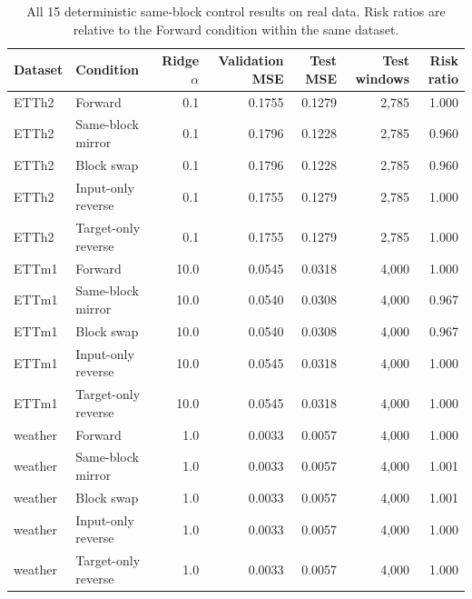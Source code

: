 
\begin{table}[t]
\centering
\caption{All 15 deterministic same-block control results on real data. Risk ratios are relative to the Forward condition within the same dataset.}
\label{tab:same-block-all}
\small
\begin{tabular}{@{}llrrrrr@{}}
\toprule
Dataset & Condition & Ridge $\alpha$ & Validation MSE & Test MSE & Test windows & Risk ratio\\
\midrule
ETTh2 & Forward & 0.1 & 0.1755 & 0.1279 & 2,785 & 1.000 \\
ETTh2 & Same-block mirror & 0.1 & 0.1796 & 0.1228 & 2,785 & 0.960 \\
ETTh2 & Block swap & 0.1 & 0.1796 & 0.1228 & 2,785 & 0.960 \\
ETTh2 & Input-only reverse & 0.1 & 0.1755 & 0.1279 & 2,785 & 1.000 \\
ETTh2 & Target-only reverse & 0.1 & 0.1755 & 0.1279 & 2,785 & 1.000 \\
ETTm1 & Forward & 10.0 & 0.0545 & 0.0318 & 4,000 & 1.000 \\
ETTm1 & Same-block mirror & 10.0 & 0.0540 & 0.0308 & 4,000 & 0.967 \\
ETTm1 & Block swap & 10.0 & 0.0540 & 0.0308 & 4,000 & 0.967 \\
ETTm1 & Input-only reverse & 10.0 & 0.0545 & 0.0318 & 4,000 & 1.000 \\
ETTm1 & Target-only reverse & 10.0 & 0.0545 & 0.0318 & 4,000 & 1.000 \\
weather & Forward & 1.0 & 0.0033 & 0.0057 & 4,000 & 1.000 \\
weather & Same-block mirror & 1.0 & 0.0033 & 0.0057 & 4,000 & 1.001 \\
weather & Block swap & 1.0 & 0.0033 & 0.0057 & 4,000 & 1.001 \\
weather & Input-only reverse & 1.0 & 0.0033 & 0.0057 & 4,000 & 1.000 \\
weather & Target-only reverse & 1.0 & 0.0033 & 0.0057 & 4,000 & 1.000 \\
\bottomrule
\end{tabular}
\end{table}
